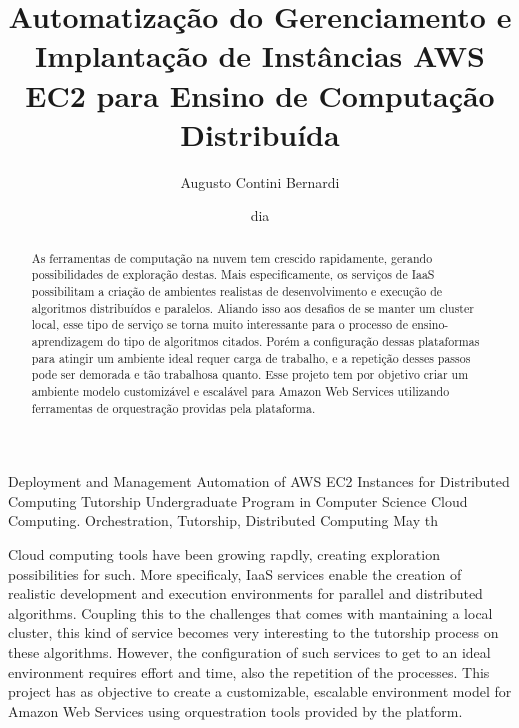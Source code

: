 \documentclass[tg]{mdtufsm}
\title{Automatização do Gerenciamento e Implantação de Instâncias AWS EC2 para Ensino de Computação Distribuída}
\author{Augusto Contini Bernardi}{Cezar}
\institute{Centro de Tecnologia}
\date{dia}{Maio}{2016}
\begin{document}
\maketitle



\begin{abstract}
As ferramentas de computação na nuvem tem crescido rapidamente, gerando possibilidades de exploração destas. Mais especificamente, os serviços de IaaS possibilitam a criação de ambientes realistas de desenvolvimento e execução de algoritmos distribuídos e paralelos. Aliando isso aos desafios de se manter um cluster local, esse tipo de serviço se torna muito interessante para o processo de ensino-aprendizagem do tipo de algoritmos citados. Porém a configuração dessas plataformas para atingir um ambiente ideal requer carga de trabalho, e a repetição desses passos pode ser demorada e tão trabalhosa quanto. Esse projeto tem por objetivo criar um ambiente modelo customizável e escalável para Amazon Web Services utilizando ferramentas de orquestração providas pela plataforma.

\end{abstract}

\begin{englishabstract}
	{Deployment and Management Automation of AWS EC2 Instances for Distributed Computing Tutorship}
	{Undergraduate Program in Computer Science}
	{Cloud Computing. Orchestration, Tutorship, Distributed Computing}
	{May}
	{th}
	
Cloud computing tools have been growing rapdly, creating exploration possibilities for such. More specificaly, IaaS services enable the creation of realistic development and execution environments for parallel and distributed algorithms. Coupling this to the challenges that comes with mantaining a local cluster, this kind of service becomes very interesting to the tutorship process on these algorithms. However, the configuration of such services to get to an ideal environment requires effort and time, also the repetition of the processes. This project has as objective to create a customizable, escalable environment model for Amazon Web Services using orquestration tools provided by the platform.
	
\end{englishabstract}
\end{document}
